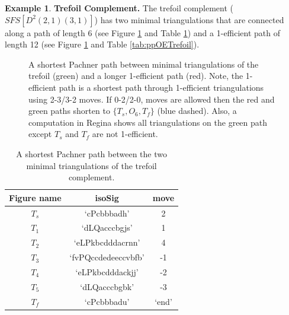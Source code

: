 \documentclass[12pt,reqno]{amsart}  %
\theoremstyle{definition}
\newtheorem{ex}[thm]{Example}
\theoremstyle{remark}
\begin{document}
\begin{ex}
{\bf Trefoil Complement.} The trefoil complement ($SFS[D^2(2,1)(3,1)]$) 
has two minimal triangulations that are connected along a path of length 
6 (see Figure \ref{fig:chartPPTrefoil} and Table \ref{tab:ppTrefoil}) and 
a 1-efficient path of length 12 (see Figure \ref{fig:chartPPTrefoil} and 
Table \ref{tab:ppOETrefoil}).

\begin{figure}[htpb!]
\caption{\label{fig:chartPPTrefoil} A shortest Pachner path between 
minimal triangulations of the trefoil (green) and a longer 1-efficient 
path (red). Note, the 1-efficient path is a shortest path through 
1-efficient triangulations using 2-3/3-2 moves. If 0-2/2-0, moves are 
allowed then the red and green paths shorten to $\{T_s, O_6, T_f\}$ (blue 
dashed). Also, a computation in Regina shows all triangulations on the 
green path except $T_s$ and $T_f$ are not 1-efficient.
} 
\end{figure}

\begin{table}
\begin{tabular}{|c|c|c|}
\hline
Figure name & isoSig & move \\
\hline
$T_s$ & `cPcbbbadh' & 2\\ 
\hline
$T_1$ & `dLQacccbgjs' & 1\\
\hline
$T_2$ & `eLPkbcdddacrnn' & 4\\
\hline
$T_3$ & `fvPQccdedeeccvbfb' &  -1\\ 
\hline
$T_4$ & `eLPkbcdddackjj' &  -2\\ 
\hline
$T_5$ & `dLQacccbgbk' & -3 \\
\hline
$T_f$ & `cPcbbbadu' & `end'\\
\hline
\end{tabular}
\caption{\label{tab:ppTrefoil} A shortest Pachner path between the two 
minimal triangulations of the trefoil complement.}
\end{table}


\end{ex}
\end{document}
